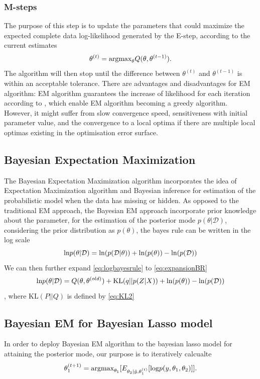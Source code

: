 \subsubsection{M-steps}
The purpose of this step is to update the parameters that could maximize the expected complete data log-likelihood generated by the E-step, according to the current estimates
\begin{equation}
	\theta^{(t)} = \textnormal{argmax}_{\theta} Q(\theta,\theta^{(t-1)}).
\end{equation}
The algorithm will then stop until the difference between $\theta^{(t)}$ and $\theta^{(t-1)}$ is within an acceptable tolerance.
There are advantages and disadvantages for EM algorithm: EM algorithm guarantees the increase of likelihood for each iteration according to \cite{EM}, which enable EM algorithm becoming a greedy algorithm. However, it might suffer from slow convergence speed, sensitiveness with initial parameter value, and the convergence to a local optima if there are multiple local optimas existing in the optimisation error surface.


\subsection{Bayesian Expectation Maximization}
The Bayesian Expectation Maximization algorithm incorporates the idea of Expectation Maximization algorithm and Bayesian inference for estimation of the probabilistic model when the data has missing or hidden. As opposed to the traditional EM approach, the Bayesian EM approach incorporate prior knowledge about the parameter, for the estimation of the posterior mode $p(\theta|\mathcal{D})$, considering the prior distribution as $p(\theta)$, the bayes rule can be written in the log scale
\begin{equation}
	\label{eq:logbayesrule}
	\textnormal{ln} p(\theta|\mathcal{D}) = \textnormal{ln}(p(\mathcal{D}|\theta)) + \textnormal{ln}(p(\theta)) - \textnormal{ln}(p(\mathcal{D}))
\end{equation}
We can then further expand \autoref{eq:logbayesrule} to \autoref{eq:expansionBR}
\begin{equation}
	\label{eq:expansionBR}
	\textnormal{ln} p(\theta|\mathcal{D}) = Q(\theta,\theta^{(old)}) + \textnormal{KL}(q||p(Z|X)) + \textnormal{ln}(p(\theta)) - \textnormal{ln}(p(\mathcal{D}))
\end{equation}
, where KL$(P||Q)$ is defined by \autoref{eq:KL2}

\subsection{Bayesian EM for Bayesian Lasso model}
In order to deploy Bayesian EM algorithm to the bayesian lasso model for attaining the posterior mode, our purpose is to iteratively calcualte 
\begin{equation}
	\theta_1^{(t+1)} = \textnormal{argmax}_{\theta_1}[E_{\theta_2|\tilde{y},\theta_1^{(t)}}[\textnormal{log}p(y,\theta_1,\theta_2)]].
\end{equation}

